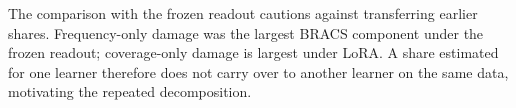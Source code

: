 The comparison with the frozen readout cautions against transferring earlier shares. Frequency-only damage was the largest BRACS component under the frozen readout; coverage-only damage is largest under LoRA. A share estimated for one learner therefore does not carry over to another learner on the same data, motivating the repeated decomposition.
